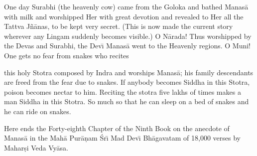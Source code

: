One day Surabhi (the heavenly cow) came from the Goloka and bathed Manas\=a with milk and worshipped Her with great devotion and revealed to Her all the Tattva J\~n\=anas, to be kept very secret. (This is now made the current story wherever any Lingam suddenly becomes visible.) O N\=arada! Thus worshipped by the Devas and Surabhi, the Dev\={\i} Manas\=a went to the Heavenly regions. O Muni! One gets no fear from snakes who recites

this holy Stotra composed by Indra and worships Manas\=a; his family descendants are freed from the fear due to snakes. If anybody becomes Siddha in this Stotra, poison becomes nectar to him. Reciting the stotra five lakhs of times makes a man Siddha in this Stotra. So much so that he can sleep on a bed of snakes and he can ride on snakes.

Here ends the Forty-eighth Chapter of the Ninth Book on the anecdote of Manas\=a in the Mah\=a Pur\=a\d{n}am \'Sr\={\i} Mad Dev\={\i} Bh\=agavatam of 18,000 verses by Mahar\d{s}i Veda Vy\=asa.



